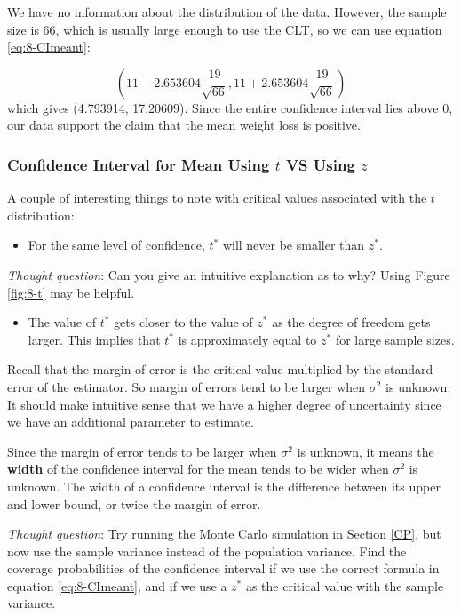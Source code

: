 \documentclass[
]{book}
\providecommand{\tightlist}{%
  \setlength{\itemsep}{0pt}\setlength{\parskip}{0pt}}
\begin{document}
We have no information about the distribution of the data. However, the sample size is 66, which is usually large enough to use the CLT, so we can use equation \eqref{eq:8-CImeant}:

\[
\left( 11 - 2.653604 \frac{19}{\sqrt{66}} , 11 + 2.653604 \frac{19}{\sqrt{66}} \right)
\]
which gives (4.793914, 17.20609). Since the entire confidence interval lies above 0, our data support the claim that the mean weight loss is positive.

\subsubsection{\texorpdfstring{Confidence Interval for Mean Using \(t\) VS Using \(z\)}{Confidence Interval for Mean Using t VS Using z}}\label{confidence-interval-for-mean-using-t-vs-using-z}

A couple of interesting things to note with critical values associated with the \(t\) distribution:

\begin{itemize}
\tightlist
\item
  For the same level of confidence, \(t^*\) will never be smaller than \(z^*\).
\end{itemize}

\emph{Thought question}: Can you give an intuitive explanation as to why? Using Figure \ref{fig:8-t} may be helpful.

\begin{itemize}
\tightlist
\item
  The value of \(t^*\) gets closer to the value of \(z^*\) as the degree of freedom gets larger. This implies that \(t^*\) is approximately equal to \(z^*\) for large sample sizes.
\end{itemize}

Recall that the margin of error is the critical value multiplied by the standard error of the estimator. So margin of errors tend to be larger when \(\sigma^2\) is unknown. It should make intuitive sense that we have a higher degree of uncertainty since we have an additional parameter to estimate.

Since the margin of error tends to be larger when \(\sigma^2\) is unknown, it means the \textbf{width} of the confidence interval for the mean tends to be wider when \(\sigma^2\) is unknown. The width of a confidence interval is the difference between its upper and lower bound, or twice the margin of error.

\emph{Thought question}: Try running the Monte Carlo simulation in Section \ref{CP}, but now use the sample variance instead of the population variance. Find the coverage probabilities of the confidence interval if we use the correct formula in equation \eqref{eq:8-CImeant}, and if we use a \(z^*\) as the critical value with the sample variance.
\end{document}
